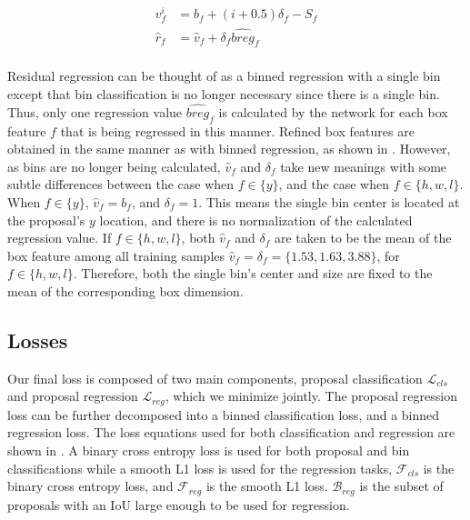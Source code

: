 \documentclass[10pt,twocolumn,letterpaper]{article}
\begin{document}
\begin{equation}
    \begin{split}
    v^i_f &= b_f + (i + 0.5) \delta_f  - S_f\\
    \hat{r}_f &= \hat{v}_f + \delta_f \widehat{breg}_f\\
    \label{eq:refine}
    \end{split}
\end{equation}
    


Residual regression can be thought of as a binned regression with a single bin except that bin classification is no longer necessary since there is a single bin.
Thus, only one regression value $\widehat{breg}_f$ is calculated by the network for each box feature $f$ that is being regressed in this manner.
Refined box features are obtained in the same manner as with binned regression, as shown in .
However, as bins are no longer being calculated, $\hat{v}_f$ and $\delta_f$ take new meanings with some subtle differences between the case when $f \in \{y\}$, and the case when $f \in \{h, w, l\}$.
When $f \in \{y\}$, $\hat{v}_f = b_f$, and $\delta_f = 1$.
This means the single bin center is located at the proposal's $y$ location, and there is no normalization of the calculated regression value.
If $f \in \{h, w, l\}$, both $\hat{v}_f$ and $\delta_f$ are taken to be the mean of the box feature among all training samples \ie $\hat{v}_f = \delta_f = \{1.53, 1.63, 3.88\}$, for $f \in \{h, w, l\}$.
Therefore, both the single bin's center and size are fixed to the mean of the corresponding box dimension.










\subsection{Losses}
Our final loss is composed of two main components, proposal classification $ \mathcal{L}_{cls} $ and proposal regression $ \mathcal{L}_{reg} $, which we minimize jointly.
The proposal regression loss can be further decomposed into a binned classification loss, and a binned regression loss.
The loss equations used for both classification and regression are shown in .
A binary cross entropy loss is used for both proposal and bin classifications while a
smooth L1 loss is used for the regression tasks, \ie $\mathcal{F}_{cls}$ is the binary cross entropy loss, and $\mathcal{F}_{reg}$ is the smooth L1 loss.
$\mathcal{B}_{reg}$ is the subset of proposals with an IoU large enough to be used for regression.
\end{document}
